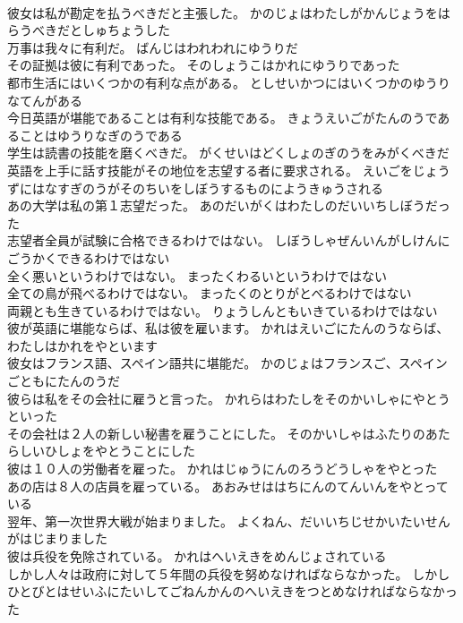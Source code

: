 \documentclass[8pt]{extreport}
\begin{document}
\begin{CJK}{UTF8}{min}
\\	彼女は私が勘定を払うべきだと主張した。	かのじょはわたしがかんじょうをはらうべきだとしゅちょうした 
\\	万事は我々に有利だ。	ばんじはわれわれにゆうりだ 
\\	その証拠は彼に有利であった。	そのしょうこはかれにゆうりであった 
\\	都市生活にはいくつかの有利な点がある。	としせいかつにはいくつかのゆうりなてんがある 
\\	今日英語が堪能であることは有利な技能である。	きょうえいごがたんのうであることはゆうりなぎのうである 
\\	学生は読書の技能を磨くべきだ。	がくせいはどくしょのぎのうをみがくべきだ 
\\	英語を上手に話す技能がその地位を志望する者に要求される。	えいごをじょうずにはなすぎのうがそのちいをしぼうするものにようきゅうされる 
\\	あの大学は私の第１志望だった。	あのだいがくはわたしのだいいちしぼうだった 
\\	志望者全員が試験に合格できるわけではない。	しぼうしゃぜんいんがしけんにごうかくできるわけではない 
\\	全く悪いというわけではない。	まったくわるいというわけではない 
\\	全ての鳥が飛べるわけではない。	まったくのとりがとべるわけではない 
\\	両親とも生きているわけではない。	りょうしんともいきているわけではない 
\\	彼が英語に堪能ならば、私は彼を雇います。	かれはえいごにたんのうならば、わたしはかれをやといます 
\\	彼女はフランス語、スペイン語共に堪能だ。	かのじょはフランスご、スペインごともにたんのうだ 
\\	彼らは私をその会社に雇うと言った。	かれらはわたしをそのかいしゃにやとうといった 
\\	その会社は２人の新しい秘書を雇うことにした。	そのかいしゃはふたりのあたらしいひしょをやとうことにした 
\\	彼は１０人の労働者を雇った。	かれはじゅうにんのろうどうしゃをやとった 
\\	あの店は８人の店員を雇っている。	あおみせははちにんのてんいんをやとっている 
\\	翌年、第一次世界大戦が始まりました。	よくねん、だいいちじせかいたいせんがはじまりました 
\\	彼は兵役を免除されている。	かれはへいえきをめんじょされている 
\\	しかし人々は政府に対して５年間の兵役を努めなければならなかった。	しかしひとびとはせいふにたいしてごねんかんのへいえきをつとめなければならなかった 

\end{CJK}
\end{document}

